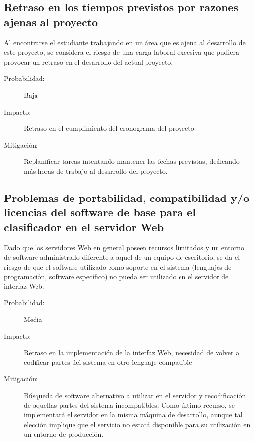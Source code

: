\documentclass[12pt,bibliography=oldstyle,DIV=14,parskip=full-,titlepage]{scrartcl}
\begin{document}
\subsection{Retraso en los tiempos previstos por razones ajenas al proyecto}
Al encontrarse el estudiante trabajando en un área que es ajena al
desarrollo de este proyecto, se considera el riesgo de una carga
laboral excesiva que pudiera provocar un retraso en el desarrollo del
actual proyecto.
\begin{description}
  \item[Probabilidad:] Baja
  \item[Impacto:] Retraso en el cumplimiento del cronograma del
    proyecto
  \item[Mitigación:] Replanificar tareas intentando mantener las
    fechas previstas, dedicando más horas de trabajo al desarrollo del
    proyecto.
\end{description}
%
\subsection{Problemas de portabilidad, compatibilidad y/o
  licencias del software de base para el clasificador en el servidor Web}
Dado que los servidores Web en general poseen recursos limitados y un
entorno de software administrado diferente a aquel de un equipo de
escritorio, se da el riesgo de que el software utilizado como soporte
en el sistema (lenguajes de programación, software específico) no
pueda ser utilizado en el servidor de interfaz Web.
\begin{description}
  \item[Probabilidad:] Media
  \item[Impacto:] Retraso en la implementación de la interfaz Web,
    necesidad de volver a codificar partes del sistema en otro
    lenguaje compatible
  \item[Mitigación:] Búsqueda de software alternativo a utilizar en el
    servidor y recodificación de aquellas partes del sistema
    incompatibles. Como último recurso, se implementará el servidor en
    la misma máquina de desarrollo, aunque tal elección implique que
    el servicio no estará disponible para su utilización en un entorno
    de producción.
\end{description}
%
%
\end{document}
